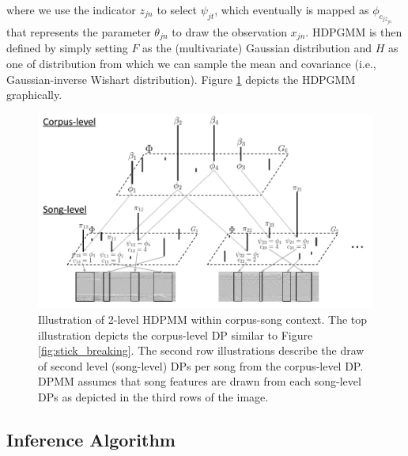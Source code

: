 \documentclass{article}
\begin{document}
where we use the indicator $z_{jn}$ to select $\psi_{jt}$, which eventually is mapped as $\phi_{c_{jz_{jn}}}$ that represents the parameter $\theta_{jn}$ to draw the observation $x_{jn}$. HDPGMM is then defined by simply setting $F$ as the (multivariate) Gaussian distribution and $H$ as one of distribution from which we can sample the mean and covariance (i.e., Gaussian-inverse Wishart distribution). Figure \ref{fig:hdpmm} depicts the HDPGMM graphically.
\begin{figure}[ht]
    \centering
    \includegraphics[width=\linewidth]{figs/HDP-stick-breaking.pdf}
    \caption{Illustration of 2-level HDPMM within corpus-song context. The top illustration depicts the corpus-level DP similar to Figure \ref{fig:stick_breaking}. The second row illustrations describe the draw of second level (song-level) DPs per song from the corpus-level DP. DPMM assumes that song features are drawn from each song-level DPs as depicted in the third rows of the image.}
    \label{fig:hdpmm}
\end{figure}


\subsection{Inference Algorithm}\label{sec:hdpgmm:inference}
\end{document}
